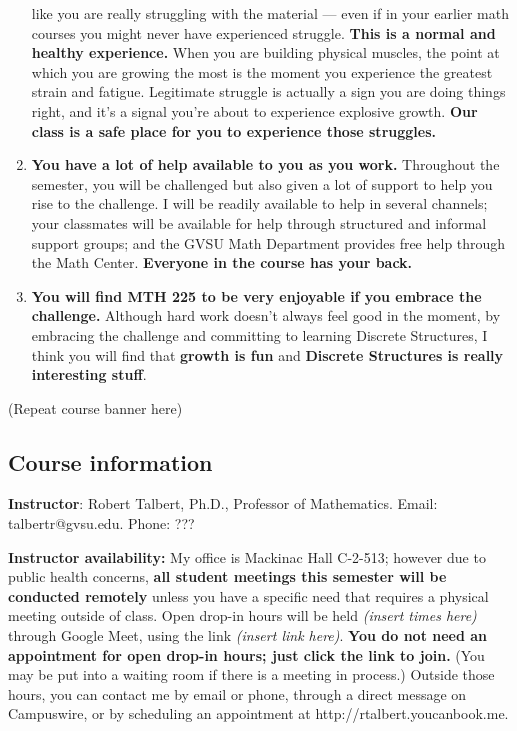 \documentclass[]{article}
\begin{document}
\begin{enumerate}
  like you are really struggling with the material --- even if in your
  earlier math courses you might never have experienced struggle.
  \textbf{This is a normal and healthy experience.} When you are
  building physical muscles, the point at which you are growing the most
  is the moment you experience the greatest strain and fatigue.
  Legitimate struggle is actually a sign you are doing things right, and
  it's a signal you're about to experience explosive growth. \textbf{Our
  class is a safe place for you to experience those struggles.}
\item
  \textbf{You have a lot of help available to you as you work.}
  Throughout the semester, you will be challenged but also given a lot
  of support to help you rise to the challenge. I will be readily
  available to help in several channels; your classmates will be
  available for help through structured and informal support groups; and
  the GVSU Math Department provides free help through the Math Center.
  \textbf{Everyone in the course has your back.}
\item
  \textbf{You will find MTH 225 to be very enjoyable if you embrace the
  challenge.} Although hard work doesn't always feel good in the moment,
  by embracing the challenge and committing to learning Discrete
  Structures, I think you will find that \textbf{growth is fun} and
  \textbf{Discrete Structures is really interesting stuff}.
\end{enumerate}

(Repeat course banner here)

\hypertarget{course-information}{%
\subsection{Course information}\label{course-information}}

\textbf{Instructor}: Robert Talbert, Ph.D., Professor of Mathematics.
Email: talbertr@gvsu.edu. Phone: ???

\textbf{Instructor availability:} My office is Mackinac Hall C-2-513;
however due to public health concerns, \textbf{all student meetings this
semester will be conducted remotely} unless you have a specific need
that requires a physical meeting outside of class. Open drop-in hours
will be held \emph{(insert times here)} through Google Meet, using the
link \emph{(insert link here)}. \textbf{You do not need an appointment
for open drop-in hours; just click the link to join.} (You may be put
into a waiting room if there is a meeting in process.) Outside those
hours, you can contact me by email or phone, through a direct message on
Campuswire, or by scheduling an appointment at
http://rtalbert.youcanbook.me.
\end{document}
